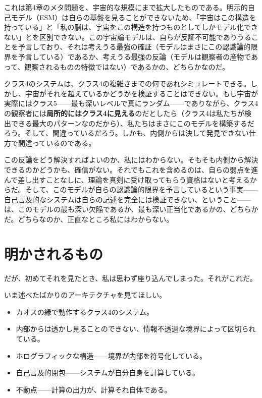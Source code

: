 \documentclass[11pt, twoside, openright]{book}
\begin{document}
これは第4章のメタ問題を、宇宙的な規模にまで拡大したものである。明示的自己モデル（ESM）は自らの基盤を見ることができないため、「宇宙はこの構造を持っている」と「私の脳は、宇宙をこの構造を持つものとしてしかモデル化できない」とを区別できない。この宇宙論モデルは、自らが反証不可能でありうることを予言しており、それは考えうる最強の確証（モデルはまさにこの認識論的限界を予言している）であるか、考えうる最強の反論（モデルは観察者の産物であって、観察されるものの特徴ではない）であるかの、どちらかなのだ。

クラス4のシステムは、クラス4の複雑さまでの何であれシミュレートできる。しかし、宇宙がそれを超えているかどうかを検証することはできない。もし宇宙が実際にはクラス5------最も深いレベルで真にランダム------でありながら、クラス4の観察者には\textbf{局所的にはクラス4に見える}のだとしたら（クラス4は私たちが検出できる最大のパターンなのだから）、私たちはまさにこのモデルを構築するだろう。そして、間違っているだろう。しかも、内側からは決して発見できない仕方で間違っているのである。

この反論をどう解決すればよいのか、私にはわからない。そもそも内側から解決できるのかどうかも、確信がない。それでもこれを含めるのは、自らの弱点を進んで差し出すことなしに、理論を真剣に受け取ってもらう資格はないと考えるからだ。そして、このモデルが自らの認識論的限界を予言しているという事実------自己言及的なシステムは自らの記述を完全には検証できない、ということ------は、このモデルの最も深い欠陥であるか、最も深い正当化であるかの、どちらかだ。どちらなのか、正直なところ私にはわからない。


\section*{明かされるもの}

だが、初めてそれを見たとき、私は思わず座り込んでしまった。それがこれだ。

いま述べたばかりのアーキテクチャを見てほしい。

\begin{itemize}
  \item カオスの縁で動作するクラス4のシステム。
  \item 内部からは透かし見ることのできない、情報不透過な境界によって区切られている。
  \item ホログラフィックな構造------境界が内部を符号化している。
  \item 自己言及的閉包------システムが自分自身を計算している。
  \item 不動点------計算の出力が、計算それ自体である。
\end{itemize}
\end{document}
